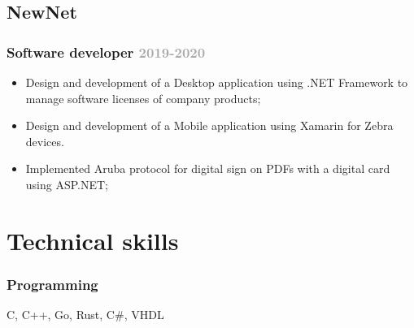 \documentclass[11pt,a4paper]{article}
\begin{document}
\subsection{NewNet}
\subsubsection{Software developer \hfill \textcolor{darkgray}{\small{2019-2020}}}
\begin{itemize}
  \item Design and development of a Desktop application using .NET Framework to manage software licenses of company products;
  \item Design and development of a Mobile application using Xamarin for Zebra devices.
  \item Implemented Aruba protocol for digital sign on PDFs with a digital card using ASP.NET;
\end{itemize}
%
%

\section{Technical skills}
\subsubsection{Programming}
C, C++, Go, Rust, C\#, VHDL
\end{document}
